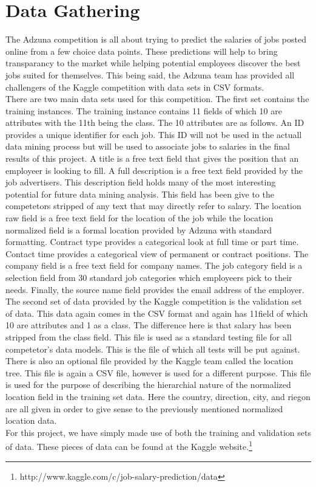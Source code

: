 \section{Data Gathering}
\label{sec:gathering}

The Adzuna competition is all about trying to predict the salaries of jobs posted online from a few choice data
points. These predictions will help to bring transparancy to the market while helping potential employees discover
the best jobs suited for themselves. This being said, the Adzuna team has provided all challengers of the Kaggle
competition with data sets in CSV formats.\\

There are two main data sets used for this competition. The first set contains the training instances. The
training instance contains 11 fields of which 10 are attributes with the 11th being the class. The 10
attributes are as follows. An ID provides a unique identifier for each job. This ID will not be used in the
actuall data mining process but will be used to associate jobs to salaries in the final results of this project.
A title is a free text field that gives the position that an employeer is looking to fill. A full description
is a free text field provided by the job advertisers. This description field holds many of the most interesting
potential for future data mining analysis. This field has been give to the competetors stripped of any 
text that may directly refer to salary. The location raw field is a free text field for the location of
the job while the location normalized field is a formal location provided by Adzuna with standard formatting.
Contract type provides a categorical look at full time or part time. Contact time provides a categorical
view of permanent or contract positions. The company field is a free text field for company names. The 
job category field is a selection field from 30 standard job categories which employeers pick to their needs.
Finally, the source name field provides the email address of the employer.\\

The second set of data provided by the Kaggle competition is the validation set of data. This data
again comes in the CSV format and again has 11field of which 10 are attributes and 1 as a class. The
difference here is that salary has been stripped from the class field. This file is used as a standard
testing file for all competetor's data models. This is the file of which all tests will be put against.\\

There is also an optional file provided by the Kaggle team called the location tree. This file is 
again a CSV file, however is used for a different purpose. This file is used for the purpose of
describing the hierarchial nature of the normalized location field in the training set data. Here
the country, direction, city, and riegon are all given in order to give sense to the previously
mentioned normalized location data.\\

For this project, we have simply made use of both the training and validation sets of data. These pieces
of data can be found at the Kaggle website.\footnote{http://www.kaggle.com/c/job-salary-prediction/data}